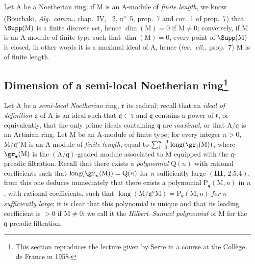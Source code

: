\begin{env}[16.1.10]
\label{0.16.1.10}
Let $\mathrm{A}$ be a Noetherian ring; if $\mathrm{M}$ is an $\mathrm{A}$-module of \emph{finite length}, we know (Bourbaki, \emph{Alg.~comm.}, chap.~IV, \textsection~2, n\textsuperscript{o}~5, prop.~7 and cor.~1 of prop.~7) that $\Supp(\mathrm{M})$ is a finite discrete set, hence $\dim(\mathrm{M})=0$ if $\mathrm{M}\neq 0$; conversely, if $\mathrm{M}$ is an $\mathrm{A}$-module of finite type such that $\dim(\mathrm{M})=0$, every point of $\Supp(\mathrm{M})$ is closed, in other words it is a maximal ideal of $\mathrm{A}$, hence (\emph{loc.~cit.}, prop.~7) $\mathrm{M}$ is of finite length.
\end{env}

\subsection[Dimension of a semi-local Noetherian ring]{Dimension of a semi-local Noetherian ring\protect\footnote{This section reproduces the lecture given by Serre in a course at the Collège de France in 1958.}}
\label{subsection:0.16.2}

\begin{env}[16.2.1]
\label{0.16.2.1}
Let $\mathrm{A}$ be a \emph{semi-local Noetherian} ring, $\mathfrak{r}$ its radical; recall that an \emph{ideal of definition} $\mathfrak{q}$ of $\mathrm{A}$ is an ideal such that $\mathfrak{q}\subset\mathfrak{r}$ and $\mathfrak{q}$ contains a power of $\mathfrak{r}$, or equivalently, that the only prime ideals containing $\mathfrak{q}$ are \emph{maximal}, or that $\mathrm{A}/\mathfrak{q}$ is an Artinian ring.
Let $\mathrm{M}$ be an $\mathrm{A}$-module of finite type; for every integer $n>0$, $\mathrm{M}/\mathfrak{q}^n\mathrm{M}$ is an $\mathrm{A}$-module of \emph{finite length}, equal to $\sum_{i=0}^{n-1}\operatorname{long}(\gr_i(\mathrm{M}))$, where $\gr_\bullet(\mathrm{M})$ is the $(\mathrm{A}/\mathfrak{q})$-graded module associated to $\mathrm{M}$ equipped with the $\mathfrak{q}$-preadic filtration.
Recall that there exists a \emph{polynomial} $\mathrm{Q}(n)$ with rational coefficients such that $\operatorname{long}(\gr_n(\mathrm{M}))=\mathrm{Q}(n)$ for $n$ sufficiently large $(\mathbf{III},~2.5.4)$; from this one deduces immediately that there exists a polynomial $\mathrm{P}_\mathfrak{q}(\mathrm{M},n)$ in $n$, with rational coefficients, such that $\operatorname{long}(\mathrm{M}/\mathfrak{q}^n\mathrm{M})=\mathrm{P}_\mathfrak{q}(\mathrm{M},n)$ \emph{for $n$ sufficiently large}; it is clear that this polynomial is unique and that its leading coefficient is $>0$ if $\mathrm{M}\neq 0$; we call it the \emph{Hilbert--Samuel polynomial} of $\mathrm{M}$ for the $\mathfrak{q}$-preadic filtration.
\end{env}

